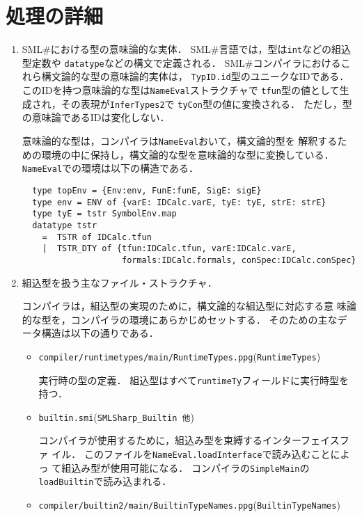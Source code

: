 \documentclass{jbook}
\newcommand{\smlsharp}{SML\#}
\newcommand{\code}[1]{\mbox{\large\tt #1}}
\newcommand{\module}[2]{\code{#1}(\code{#2})}
\begin{document}
\section{処理の詳細}
\begin{enumerate}
\item \smlsharp{}における型の意味論的な実体．
	\smlsharp{}言語では，型は\code{int}などの組込型定数や
\code{datatype}などの構文で定義される．
	\smlsharp{}コンパイラにおけるこれら構文論的な型の意味論的実体は，
\code{TypID.id}型のユニークなIDである．
	このIDを持つ意味論的な型は\code{NameEval}ストラクチャで
\code{tfun}型の値として生成され，その表現が\code{InferTypes2}で
\code{tyCon}型の値に変換される．
	ただし，型の意味論であるIDは変化しない．

	意味論的な型は，コンパイラは\code{NameEval}おいて，構文論的型を
解釈するための環境の中に保持し，構文論的な型を意味論的な型に変換している．
	\code{NameEval}での環境は以下の構造である．
\begin{verbatim}
  type topEnv = {Env:env, FunE:funE, SigE: sigE}
  type env = ENV of {varE: IDCalc.varE, tyE: tyE, strE: strE}
  type tyE = tstr SymbolEnv.map
  datatype tstr
    =  TSTR of IDCalc.tfun
    |  TSTR_DTY of {tfun:IDCalc.tfun, varE:IDCalc.varE,
                    formals:IDCalc.formals, conSpec:IDCalc.conSpec}
\end{verbatim}


\item 組込型を扱う主なファイル・ストラクチャ．

	コンパイラは，組込型の実現のために，構文論的な組込型に対応する意
味論的な型を，コンパイラの環境にあらかじめセットする．
	そのための主なデータ構造は以下の通りである．

\begin{itemize}
\item \module{compiler/runtimetypes/main/RuntimeTypes.ppg}{RuntimeTypes}

	実行時の型の定義．
	組込型はすべて\code{runtimeTy}フィールドに実行時型を持つ．

\item \module{builtin.smi}{SMLSharp\_Builtin 他}

	コンパイラが使用するために，組込み型を束縛するインターフェイスファ
イル．
	このファイルを\code{NameEval.loadInterface}で読み込むことによっ
て組込み型が使用可能になる．
	コンパイラの\code{SimpleMain}の\code{loadBuiltin}で読み込まれる．

\item \module{compiler/builtin2/main/BuiltinTypeNames.ppg}{BuiltinTypeNames}


\end{itemize}
\end{enumerate}
\end{document}

